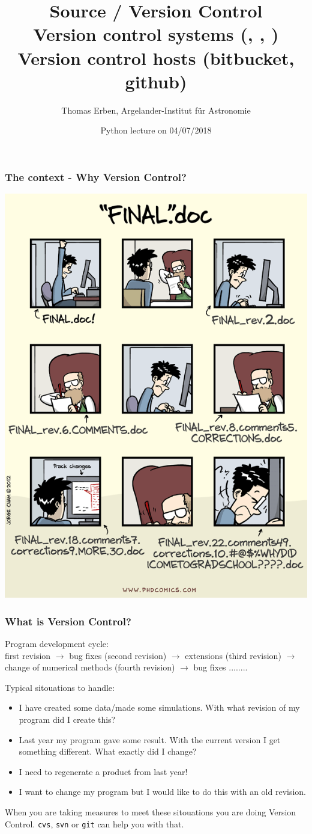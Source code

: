 \documentclass{beamer}
\title[] %
{Source / Version Control \\
Version control systems (\cvs, \svn, \git) \\
Version control hosts (bitbucket, github)}
\author[Thomas Erben] %
{Thomas Erben, Argelander-Institut f\"ur Astronomie}
\institute[] %
\date[]{Python lecture on 04/07/2018}
\newcommand{\git}{\texttt{git}\xspace}
\newcommand{\svn}{\texttt{svn}\xspace}
\newcommand{\cvs}{\texttt{cvs}\xspace}
\begin{document}
\begin{frame}
  \titlepage
\end{frame}
%
\begin{frame}
\frametitle{The context - Why Version Control?}
  \centerline{\includegraphics[height=0.75\textheight]{images/phd101212s}}
\end{frame}
%
\begin{frame}
\frametitle{What is Version Control?}
\small
{\color{red} Program development cycle:}\\
first {\color{blue} revision} $\rightarrow$ bug fixes (second revision)
$\rightarrow$ extensions (third revision) $\rightarrow$ change of
numerical methods (fourth revision) $\rightarrow$ bug fixes ........

\vspace{0.3cm}
{\color{red} Typical sitouations to handle:}
\begin{itemize}
\item I have created some data/made some simulations. With what revision of my
program did I create this?
\item Last year my program gave some result. With the current version
I get something different. What exactly did I change?
\item I need to regenerate a product from last year!
\item I want to change my program but I would like to do this with an old
revision.
\end{itemize}
When you are taking measures to meet these sitouations you are doing
{\color{blue} Version Control}. \cvs, \svn or \git can help you with that.
\end{frame}
\end{document}
